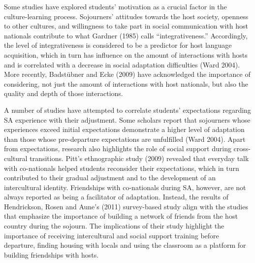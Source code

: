 \documentclass[12pt]{article}
\newenvironment{styleStandard}{\setlength\leftskip{0cm}\setlength\rightskip{0cm plus 1fil}\setlength\parindent{0cm}\setlength\parfillskip{0pt plus 1fil}\setlength\parskip{0in plus 1pt}\writerlistparindent\writerlistleftskip\leavevmode\normalfont\normalsize\writerlistlabel\ignorespaces}{\unskip\vspace{0.111in plus 0.0111in}\par}
\newcommand\writerlistleftskip{}
\newcommand\writerlistparindent{}
\newcommand\writerlistlabel{}
\begin{document}
\begin{styleStandard}
Some studies have explored students’ motivation as a crucial factor in the culture-learning process. Sojourners’ attitudes towards the host society, openness to other cultures, and willingness to take part in social communication with host nationals contribute to what Gardner (1985) calls “integrativeness.” Accordingly, the level of integrativeness is considered to be a predictor for host language acquisition, which in turn has influence on the amount of interactions with hosts and is correlated with a decrease in social adaptation difficulties (Ward 2004). More recently, Badstübner and Ecke (2009) have acknowledged the importance of considering, not just the amount of interactions with host nationals, but also the quality and depth of those interactions. 
\end{styleStandard}

\begin{styleStandard}
A number of studies have attempted to correlate students’ expectations regarding SA experience with their adjustment. Some scholars report that sojourners whose experiences exceed initial expectations demonstrate a higher level of adaptation than those whose pre-departure expectations are unfulfilled (Ward 2004). Apart from expectations, research also highlights the role of social support during cross-cultural transitions. Pitt’s ethnographic study (2009) revealed that everyday talk with co-nationals helped students reconsider their expectations, which in turn contributed to their gradual adjustment and to the development of an intercultural identity. Friendships with co-nationals during SA, however, are not always reported as being a facilitator of adaptation. Instead, the results of Hendrickson, Rosen and Aune’s (2011) survey-based study align with the studies that emphasize the importance of building a network of friends from the host country during the sojourn. The implications of their study highlight the importance of receiving intercultural and social support training before departure, finding housing with locals and using the classroom as a platform for building friendships with hosts. \ 
\end{styleStandard}
\end{document}
